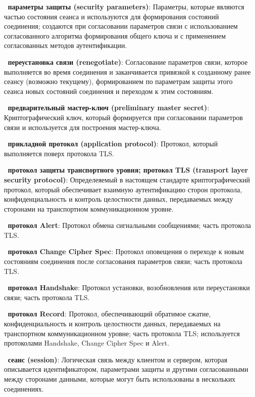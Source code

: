 {\bf \thedefctr~параметры защиты (security parameters)}:
Параметры, которые являются частью состояния сеанса и используются для 
формирования состояний соединения; создаются при согласовании параметров 
связи с использованием согласованного алгоритма формирования общего ключа 
и с применением согласованных методов аутентификации. 

{\bf \thedefctr~переустановка связи (renegotiate)}:
Согласование параметров связи, которое выполняется во время соединения и 
заканчивается привязкой к созданному ранее сеансу (возможно текущему), 
формированием по параметрам защиты этого сеанса новых состояний соединения 
и переходом к этим состояниям. 

{\bf \thedefctr~предварительный мастер-ключ (preliminary master secret)}:
Криптографический ключ, который формируется при согласовании параметров 
связи и используется для построения мастер-ключа. 

{\bf \thedefctr~прикладной протокол (application protocol)}:
Протокол, который выполняется поверх протокола TLS.

{\bf \thedefctr~протокол защиты транспортного уровня; протокол TLS 
(transport layer security protocol)}: 
Определеяемый в настоящем стандарте криптографический протокол, который 
обеспечивает взаимную аутентификацию сторон протокола, конфиденциальность 
и контроль целостности данных, передаваемых между сторонами на 
транспортном коммуникационном уровне. 

{\bf \thedefctr~протокол Alert}:
Протокол обмена сигнальными сообщениями; часть протокола TLS. 

{\bf \thedefctr~протокол Change Cipher Spec}:
Протокол оповещения о переходе к новым состояниям соединения после 
согласования параметров связи; часть протокола TLS. 

{\bf \thedefctr~протокол Handshake}:
Протокол установки, возобновления или переустановки связи; часть протокола 
TLS. 

{\bf \thedefctr~протокол Record}:
Протокол, обеспечивающий обратимое сжатие, конфиденциальность и контроль 
целостности данных, передаваемых на транспортном коммуникационном уровне; 
часть протокола TLS; используется протоколами Handshake, Change Cipher 
Spec и Alert. 

{\bf \thedefctr~сеанс (session)}:
Логическая связь между клиентом и сервером, которая описывается 
идентификатором, параметрами защиты и другими согласованными между 
сторонами данными, которые могут быть использованы в нескольких 
соединениях. 

